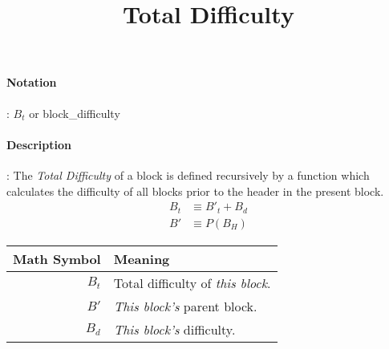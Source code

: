 \documentclass[10pt,a4paper,oneside]{scrartcl}
\author{}
\title{Total Difficulty}
\date{}
\begin{document}
\maketitle
\paragraph{Notation}: \textit{$B_t$} or block\_difficulty
\paragraph{Description}: The \textit{Total Difficulty} of a block is defined recursively by a function which calculates the difficulty of all blocks prior to the header in the present block. 
\begin{align}
B_t & \equiv B'_t + B_d \\
B' & \equiv P(B_H)	
\end{align}
\par
\begin{tabular}{ r l }
	\toprule
	  \textbf{Math Symbol} & \textbf{Meaning} \\
	\midrule
	   $B_t$ 	       & Total difficulty of \textsl{this block}. \\
	   $B'$	 	       & \textsl{This block's} parent block. \\
	   $B_d$	       & \textsl{This block's} difficulty. \\
	\bottomrule
\end{tabular}
\end{document}
